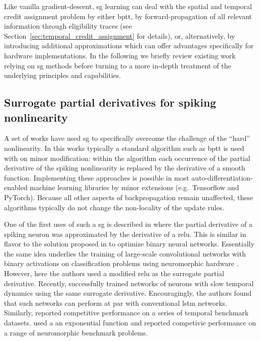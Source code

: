 \documentclass[journal,onecolumn,11pt]{IEEEtran}
\begin{document}
Like vanilla gradient-descent, \gls{sg} learning can deal with the spatial and temporal credit assignment problem by either \gls{bptt}, by forward-propagation of all relevant information through eligibility traces (see Section~\ref{sec:temporal_credit_assignment} for details), or, alternatively, by introducing additional approximations which can offer advantages specifically for hardware implementations. 
In the following we briefly review existing work relying on \gls{sg} methods before turning to a more in-depth treatment of the underlying principles and capabilities. 


\subsection{Surrogate partial derivatives for spiking nonlinearity}
A set of works have used \gls{sg} to specifically overcome the challenge of the ``hard'' nonlinearity. 
In this works typically a standard algorithm such as \gls{bptt} is used with on minor modification: within the algorithm each occurrence of the partial derivative of the spiking nonlinearity is replaced by the derivative of a smooth function.
Implementing these approaches is possible in most auto-differentiation-enabled machine learning libraries by minor extensions (e.g.\ Tensorflow and PyTorch).
Because all other aspects of backpropagation remain unaffected, these algorithms typically do not change the non-locality of the update rules. 


One of the first uses of such a \gls{sg} is described in
\citet{bohte_error-backpropagation_2011} where the partial derivative of a
spiking neuron was approximated by the derivative of a \gls{relu}.
This is similar in flavor to the solution proposed in 
\citep{courbariaux_binarized_2016} to optimize binary neural networks. 
Essentially the same idea underlies the training of large-scale
convolutional networks with binary activations on classification problems using neuromorphic hardware \cite{esser_convolutional_2016}.
However, here the authors used a modified \gls{relu} as the surrogate partial derivative.
Recently, \cite{Bellec_etal18_longshor} successfully trained networks of 
neurons with slow temporal dynamics using the same surrogate derivative. 
Encouragingly, the  authors found that such networks can perform at par with conventional \gls{lstm} networks.
Similarly, \citet{Wozniak_etal18_deepnetw} reported competitive performance on a series of temporal benchmark datasets.
\citet{Shrestha_Orchard18_slayspik} used a an exponential function and reported competivie performance on a range of neuromorphic benchmark problems.
\end{document}
